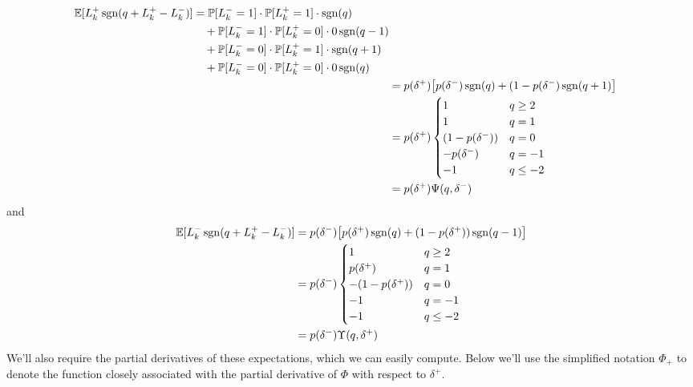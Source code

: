 \begin{align}
\begin{split}
\mathbb{E} [ L_k^+ \operatorname{\mathrm{sgn}}(q + L_k^+ - L_k^-)] & = \mathbb{P}[L_k^- = 1] \cdot \mathbb{P}[L_k^+ = 1] \cdot \operatorname{\mathrm{sgn}}(q) \\
& \quad + \mathbb{P}[L_k^- = 1] \cdot \mathbb{P}[L_k^+ = 0] \cdot 0 \operatorname{\mathrm{sgn}}(q - 1) \\
& \quad +  \mathbb{P}[L_k^- = 0] \cdot \mathbb{P}[L_k^+ = 1] \cdot \operatorname{\mathrm{sgn}}(q+1) \\
& \quad + \mathbb{P}[L_k^- = 0] \cdot \mathbb{P}[L_k^+ = 0] \cdot 0 \operatorname{\mathrm{sgn}}(q)
\end{split} \\
& = p(\delta^+) \bigl[ p(\delta^-) \operatorname{\mathrm{sgn}}(q) + (1-p(\delta^-) \operatorname{\mathrm{sgn}}(q+1) \bigr] \\
& = p(\delta^+) \begin{cases} 
1 & q \geq 2 \\
1 & q = 1 \\
(1 - p(\delta^-)) & q = 0 \\
-p(\delta^-) & q = -1 \\
-1 & q \leq -2
\end{cases} \\
& = p(\delta^+) \Psi(q, \delta^-)
\end{align}
and
\begin{align}
\mathbb{E} [ L_k^- \operatorname{\mathrm{sgn}}(q + L_k^+ - L_k^-)] & = p(\delta^-) \bigl[ p(\delta^+) \operatorname{\mathrm{sgn}}(q) + (1-p(\delta^+)) \operatorname{\mathrm{sgn}}(q-1) \bigr] \\
& = p(\delta^-) \begin{cases} 
1 & q \geq 2 \\
p(\delta^+) & q = 1 \\
-(1 - p(\delta^+)) & q = 0 \\
-1 & q = -1 \\
-1 & q \leq -2
\end{cases} \\
& = p(\delta^-) \Upsilon(q, \delta^+)
\end{align}
We'll also require the partial derivatives of these expectations, which we can easily compute. Below we'll use the simplified notation $\Phi_+$ to denote the function closely associated with the partial derivative of $ \Phi$ with respect to $\delta^+$.
